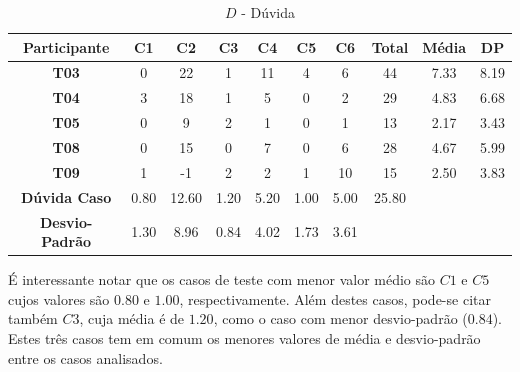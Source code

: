 \begin{table}[htbp]
	\centering
	\caption{$D$ - Dúvida}
	\begin{tabular}{|c|c|c|c|c|c|c|ccc}
		\hline
		\rowcolor[HTML]{D9D9D9} 
		\cellcolor[HTML]{D0CECE}\textbf{Participante} & \textbf{C1} & \textbf{C2} & \textbf{C3} & \textbf{C4} & \textbf{C5} & \textbf{C6} & \multicolumn{1}{c|}{\cellcolor[HTML]{D0CECE}\textbf{Total}} & \multicolumn{1}{c|}{\cellcolor[HTML]{D9D9D9}\textbf{Média}} & \multicolumn{1}{c|}{\cellcolor[HTML]{D9D9D9}\textbf{DP}} \\ \hline
		\cellcolor[HTML]{F2F2F2}\textbf{T03} & 0 & 22 & 1 & 11 & 4 & 6 & \multicolumn{1}{c|}{44} & \multicolumn{1}{c|}{7.33} & \multicolumn{1}{c|}{8.19} \\ \hline
		\rowcolor[HTML]{D9D9D9} 
		\textbf{T04} & 3 & 18 & 1 & 5 & 0 & 2 & \multicolumn{1}{c|}{\cellcolor[HTML]{D9D9D9}29} & \multicolumn{1}{c|}{\cellcolor[HTML]{D9D9D9}4.83} & \multicolumn{1}{c|}{\cellcolor[HTML]{D9D9D9}6.68} \\ \hline
		\cellcolor[HTML]{F2F2F2}\textbf{T05} & 0 & 9 & 2 & 1 & 0 & 1 & \multicolumn{1}{c|}{13} & \multicolumn{1}{c|}{2.17} & \multicolumn{1}{c|}{3.43} \\ \hline
		\rowcolor[HTML]{D9D9D9} 
		\textbf{T08} & 0 & 15 & 0 & 7 & 0 & 6 & \multicolumn{1}{c|}{\cellcolor[HTML]{D9D9D9}28} & \multicolumn{1}{c|}{\cellcolor[HTML]{D9D9D9}4.67} & \multicolumn{1}{c|}{\cellcolor[HTML]{D9D9D9}5.99} \\ \hline
		\cellcolor[HTML]{F2F2F2}\textbf{T09} & 1 & -1 & 2 & 2 & 1 & 10 & \multicolumn{1}{c|}{15} & \multicolumn{1}{c|}{2.50} & \multicolumn{1}{c|}{3.83} \\ \hline
		\cellcolor[HTML]{D9D9D9}\textbf{Dúvida Caso} & \cellcolor[HTML]{D9D9D9}0.80 & \cellcolor[HTML]{D9D9D9}12.60 & \cellcolor[HTML]{D9D9D9}1.20 & \cellcolor[HTML]{D9D9D9}5.20 & \cellcolor[HTML]{D9D9D9}1.00 & \cellcolor[HTML]{D9D9D9}5.00 & \multicolumn{1}{c|}{\cellcolor[HTML]{D9D9D9}25.80} & \multicolumn{1}{l}{} & \multicolumn{1}{l}{} \\ \cline{1-8}
		\textbf{Desvio-Padrão} & 1.30 & 8.96 & 0.84 & 4.02 & 1.73 & 3.61 & \multicolumn{1}{l}{} & \multicolumn{1}{l}{} & \multicolumn{1}{l}{} \\ \cline{1-7}
	\end{tabular}
	\label{tab:F3_A4_D}
\end{table}

É interessante notar que os casos de teste com menor valor médio são $C1$ e $C5$ cujos valores são $0.80$ e $1.00$, respectivamente. Além destes casos, pode-se citar também $C3$, cuja média é de $1.20$, como o caso com menor desvio-padrão ($0.84$). Estes três casos tem em comum os menores valores de média e desvio-padrão entre os casos analisados.

